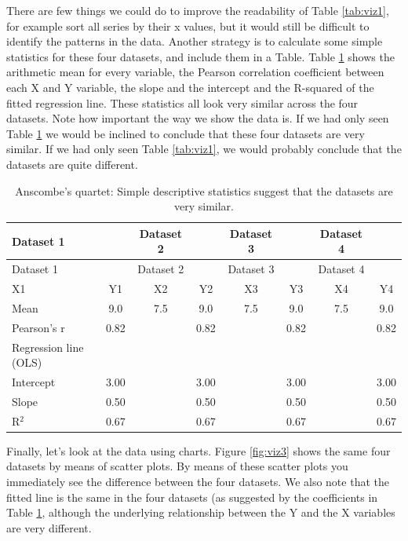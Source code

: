\documentclass[]{book}
\begin{document}
There are few things we could do to improve the readability of Table \ref{tab:viz1}, for example sort all series by their x values, but it would still be difficult to identify the patterns in the data. Another strategy is to calculate some simple statistics for these four datasets, and include them in a Table. Table \ref{tab:viz2} shows the arithmetic mean for every variable, the Pearson correlation coefficient between each X and Y variable, the slope and the intercept and the R-squared of the fitted regression line. These statistics all look very similar across the four datasets. Note how important the way we show the data is. If we had only seen Table \ref{tab:viz2} we would be inclined to conclude that these four datasets are very similar. If we had only seen Table \ref{tab:viz1}, we would probably conclude that the datasets are quite different.

\begin{longtable}[]{@{}lccccccc@{}}
\caption{\label{tab:viz2} Anscombe's quartet: Simple descriptive statistics suggest that the datasets are very similar.}\tabularnewline
\toprule
Dataset 1 & & Dataset 2 & & Dataset 3 & & Dataset 4 &\tabularnewline
\midrule
\endfirsthead
\toprule
Dataset 1 & & Dataset 2 & & Dataset 3 & & Dataset 4 &\tabularnewline
\midrule
\endhead
X1 & Y1 & X2 & Y2 & X3 & Y3 & X4 & Y4\tabularnewline
Mean & 9.0 & 7.5 & 9.0 & 7.5 & 9.0 & 7.5 & 9.0\tabularnewline
Pearson's r & 0.82 & & 0.82 & & 0.82 & & 0.82\tabularnewline
Regression line (OLS) & & & & & & &\tabularnewline
Intercept & 3.00 & & 3.00 & & 3.00 & & 3.00\tabularnewline
Slope & 0.50 & & 0.50 & & 0.50 & & 0.50\tabularnewline
R\(^{2}\) & 0.67 & & 0.67 & & 0.67 & & 0.67\tabularnewline
\bottomrule
\end{longtable}

Finally, let's look at the data using charts. Figure \ref{fig:viz3} shows the same four datasets by means of scatter plots. By means of these scatter plots you immediately see the difference between the four datasets. We also note that the fitted line is the same in the four datasets (as suggested by the coefficients in Table \ref{tab:viz2}, although the underlying relationship between the Y and the X variables are very different.
\end{document}
